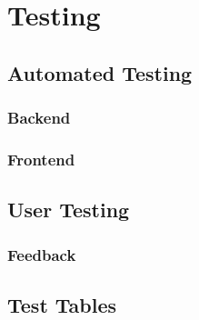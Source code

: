 \chapter{Testing}

\section{Automated Testing}

\subsection{Backend}

\subsection{Frontend}

\section{User Testing}

\subsection{Feedback}

\section{Test Tables}